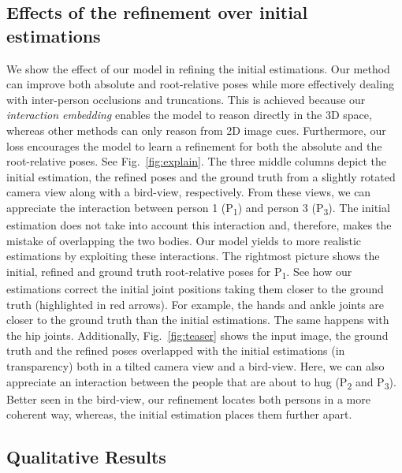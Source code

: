 %
 \subsection{Effects of the refinement over initial estimations}
We show the effect of our model in refining the initial estimations. Our method can improve both absolute and root-relative poses while more effectively dealing with inter-person occlusions and truncations. This is achieved because our \textit{interaction embedding} enables the model to reason directly in the 3D space, whereas other methods can only reason from 2D image cues. Furthermore, our loss encourages the model to learn a refinement for both the absolute and the root-relative poses. See Fig.~\ref{fig:explain}. The three middle columns depict the initial estimation, the refined poses and the ground truth from a slightly rotated camera view along with a bird-view, respectively. From these views, we can appreciate the interaction between person 1 (P\textsubscript{1}) and person 3 (P\textsubscript{3}). The initial estimation does not take into account this interaction and, therefore, makes the mistake of overlapping the two bodies. Our model yields to more realistic estimations by exploiting these interactions. The rightmost picture shows the initial, refined and ground truth root-relative poses for P\textsubscript{1}. See how our estimations correct the initial joint positions taking them closer to the ground truth (highlighted in red arrows). For example, the hands and ankle joints are closer to the ground truth than the initial estimations. The same happens with the hip joints. Additionally, Fig.~\ref{fig:teaser} shows the input image, the ground truth and the refined poses overlapped with the initial estimations (in transparency) both in a tilted camera view and a bird-view. Here, we can also appreciate an interaction between the people that are about to hug (P\textsubscript{2} and P\textsubscript{3}). Better seen in the bird-view, our refinement locates both persons in a more coherent way, whereas, the initial estimation places them further apart.



\subsection{Qualitative Results}



